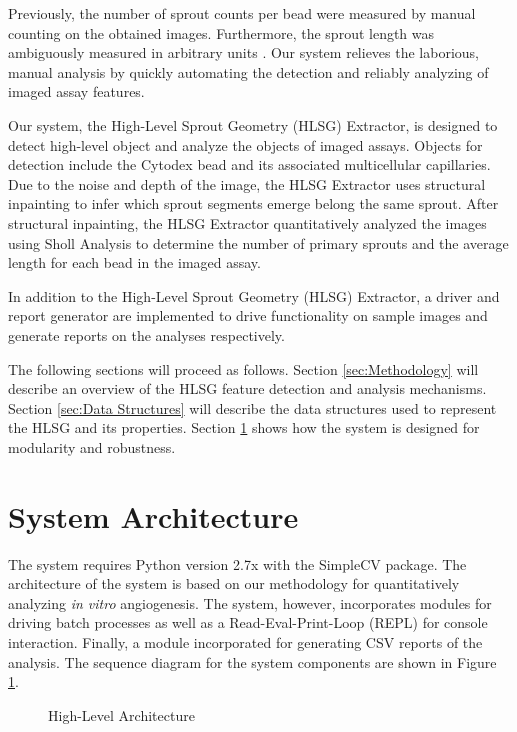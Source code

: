 \documentclass{sig-alternate}
\newcommand{\invitro}{\emph{in vitro} }
\begin{document}
	Previously, the number of sprout counts per bead were measured by manual
	counting on the obtained images. Furthermore, the sprout length was
	ambiguously measured in arbitrary units \cite{nakatsu03}. Our system
	relieves the laborious, manual analysis by quickly automating the detection
	and reliably analyzing of imaged assay features.

	Our system, the High-Level Sprout Geometry (HLSG) Extractor, is
	designed to detect high-level object and analyze the objects of imaged
	assays. Objects for detection include the Cytodex bead and its
	associated multicellular capillaries. Due to the noise and depth of
	the image, the HLSG Extractor uses structural inpainting to infer
	which sprout segments emerge belong the same sprout. After structural
	inpainting, the HLSG Extractor quantitatively analyzed the images
	using Sholl Analysis to determine the number of primary sprouts and the
	average length for each bead in the imaged assay.

	In addition to the High-Level Sprout Geometry (HLSG) Extractor, a driver
	and report generator are implemented to drive functionality on sample
	images and generate reports on the analyses respectively.

	The following sections will proceed as follows. Section
	\ref{sec:Methodology} will describe an overview of the HLSG feature
	detection and analysis mechanisms. Section \ref{sec:Data Structures}
	will describe the data structures used to represent the HLSG and its
	properties. Section \ref{sec:System Architecture} shows how the system
	is designed for modularity and robustness.

\section{System Architecture} %
\label{sec:System Architecture}
	The system requires Python version 2.7x with the SimpleCV package. The
	architecture of the system is based on our methodology for
	quantitatively analyzing \invitro angiogenesis. The system, however,
	incorporates modules for driving batch processes as well as a
	Read-Eval-Print-Loop (REPL) for console interaction. Finally, a module
	incorporated for generating CSV reports of the analysis. The sequence
	diagram for the system components are shown in Figure
	\ref{fig:sysarch}.
	\begin{figure}[ht!]
		\centering
		
		\caption{High-Level Architecture}
		\label{fig:sysarch}
	\end{figure}
\end{document}
